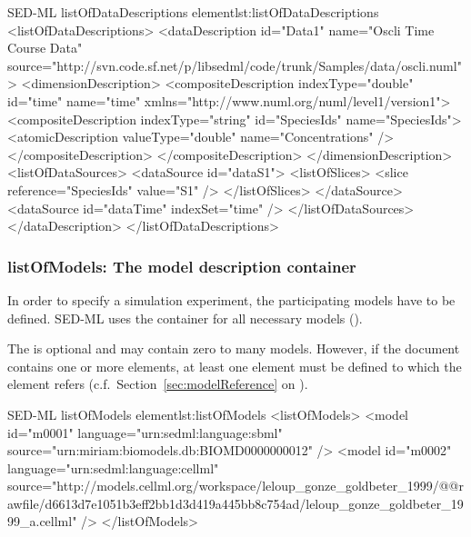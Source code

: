 \begin{myXmlLst}{SED-ML listOfDataDescriptions element}{lst:listOfDataDescriptions}
<listOfDataDescriptions>
	<dataDescription id="Data1" name="Oscli Time Course Data" source="http://svn.code.sf.net/p/libsedml/code/trunk/Samples/data/oscli.numl">
		<dimensionDescription>
			<compositeDescription indexType="double" id="time" name="time" xmlns="http://www.numl.org/numl/level1/version1">
        			<compositeDescription indexType="string" id="SpeciesIds" name="SpeciesIds">
         			<atomicDescription valueType="double" name="Concentrations" />
          		</compositeDescription>
      		</compositeDescription>
		</dimensionDescription>
		<listOfDataSources>
			<dataSource id="dataS1">
				<listOfSlices>
					<slice reference="SpeciesIds" value="S1" />
				</listOfSlices>
			</dataSource>
			<dataSource id="dataTime" indexSet="time" />
		</listOfDataSources>
	</dataDescription>
</listOfDataDescriptions>
\end{myXmlLst}


\subsubsection{listOfModels: The model description container}
\label{sec:listOfModels}
In order to specify a simulation experiment, the participating models have to be defined. SED-ML uses the  container for all necessary models (). 


The  is optional and may contain zero to many models. However, if the \currentLV document contains  one or more  elements, at least one  element must be defined to which the  element refers (c.f.\ Section~\ref{sec:modelReference} on ).

\begin{myXmlLst}{SED-ML listOfModels element}{lst:listOfModels}
<listOfModels>
	<model id="m0001" language="urn:sedml:language:sbml" 
		source="urn:miriam:biomodels.db:BIOMD0000000012" />
	<model id="m0002" language="urn:sedml:language:cellml" 
		source="http://models.cellml.org/workspace/leloup_gonze_goldbeter_1999/@@rawfile/d6613d7e1051b3eff2bb1d3d419a445bb8c754ad/leloup_gonze_goldbeter_1999_a.cellml" />
</listOfModels>
\end{myXmlLst}


